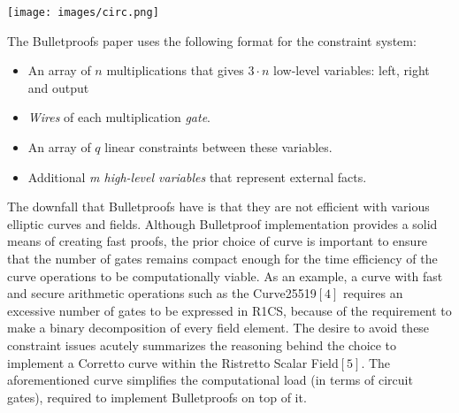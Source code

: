 \documentclass{article}
\begin{document}
\begin{center}
\texttt{[image: images/circ.png]}
\end{center}
The Bulletproofs paper uses the following format for the constraint system: 
\begin{itemize}
    \item  An array of $n$ multiplications that gives $3 \cdot n$ low-level variables: left, right and output
    \item \emph{Wires} of each multiplication \emph{gate}.
    \item An array of $q$ linear constraints between these variables.
    \item Additional \emph{m high-level variables} that represent external facts.
\end{itemize} 
The downfall that Bulletproofs have is that they are not efficient with various elliptic curves and fields. Although Bulletproof implementation provides a solid means of creating fast proofs, the prior choice of curve is important to ensure that the number of gates remains compact enough for the time efficiency of the curve operations to be computationally viable.  
As an example, a curve with fast and secure arithmetic operations such as the Curve25519$[4]$ requires an excessive number of gates to be expressed in R1CS, because of the requirement to make a binary decomposition of every field element. The desire to avoid these constraint issues acutely summarizes the reasoning behind the choice to implement a Corretto curve within the Ristretto Scalar Field$[5]$. The aforementioned curve simplifies the computational load (in terms of circuit gates), required to implement Bulletproofs on top of it.
\end{document}
